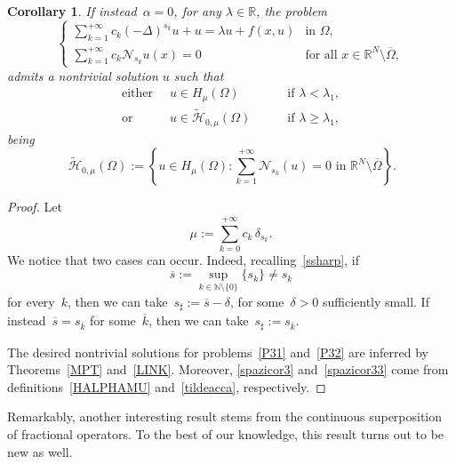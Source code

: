 \documentclass[12pt,a4paper,intlimits,sumlimits]{amsart}
\def \N {\mathbb{N}}
\def \R {\mathbb{R}}
\theoremstyle{definition}
\theoremstyle{plain}
\newtheorem{corollary}[definition]{Corollary}
\numberwithin{equation}{section}
\renewcommand{\ge}{\geqslant}
\begin{document}
\begin{corollary}
If instead~$\alpha=0$, for any $\lambda\in\R$, the problem
\begin{equation}\label{P32}
\begin{cases}
\displaystyle\sum_{k=1}^{+\infty} c_k(-\Delta)^{s_k} u +u=\lambda u +f(x,u)  &\mbox{in }\Omega,\\
\displaystyle\sum_{k=1}^{+\infty} c_k \mathscr N_{s_k} u(x)=0 &\mbox{for all }x\in \R^N \setminus \overline{\Omega}, 
\end{cases}
\end{equation}
admits a nontrivial solution $u$ such that
\begin{equation}\label{spazicor33}
\begin{alignedat}{2}
\mbox{either } \ & u\in H_\mu (\Omega)  \quad&&\mbox{ if } \lambda<\lambda_1,\\
\mbox{or } \ &u\in \widetilde{\mathcal H}_{0, \mu} (\Omega) \quad&&\mbox{ if } \lambda\ge\lambda_1,
\end{alignedat}
\end{equation}
being
\[\
\widetilde{\mathcal H}_{0, \mu}(\Omega):=\left\{u\in H_{\mu}(\Omega) : \sum_{k=1}^{+\infty}\mathscr N_{s_k} (u)=0 \mbox{ in }\R^N\setminus \overline{\Omega}\right\}.
\]
\end{corollary}
\begin{proof}
Let 
$$ \mu:= \sum_{k=0}^{+\infty} c_k \,\delta_{s_k}.$$
We notice that two cases can occur. Indeed, recalling~\eqref{ssharp}, if
$$\displaystyle\overline s:=\sup_{k\in\N\setminus\{0\}}\{s_k\} \neq s_k$$ for every~$k$, then we can take~$s_\sharp:= \overline s-\delta$, for some~$\delta>0$ sufficiently small.
If instead~$\overline s = s_{\overline k }$ for some~$\overline k$, then we can take~$s_\sharp:= s_{\overline k}$.

The desired nontrivial solutions for problems~\eqref{P31} and~\eqref{P32} are inferred by Theorems~\ref{MPT} and~\ref{LINK}.
Moreover, \eqref{spazicor3} and~\eqref{spazicor33} come from definitions~\eqref{HALPHAMU} and~\eqref{tildeacca}, respectively. 
\end{proof}

Remarkably,  another interesting result stems from the continuous superposition of fractional operators. To the best of our knowledge,  this result turns out to be new as well.
\end{document}
